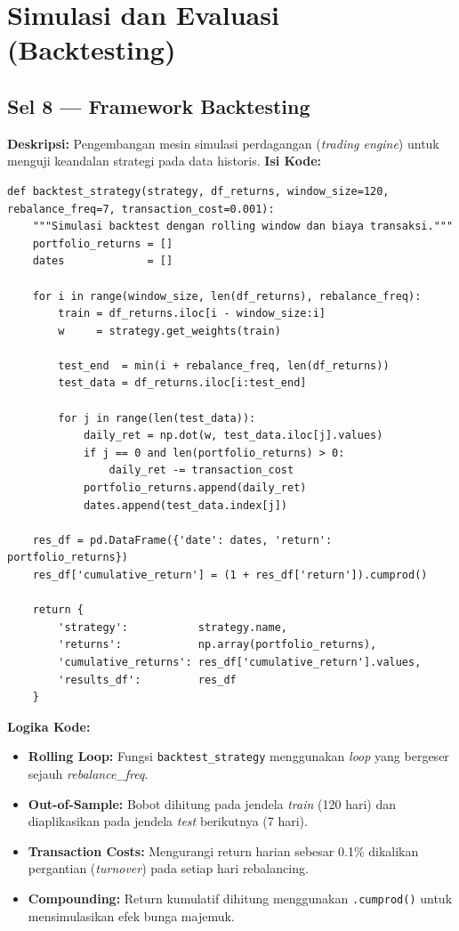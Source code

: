 \documentclass[12pt, a4paper]{article}
\begin{document}
\section{Simulasi dan Evaluasi (Backtesting)}

\subsection{Sel 8 — Framework Backtesting}
\textbf{Deskripsi:} Pengembangan mesin simulasi perdagangan (\textit{trading engine}) untuk menguji keandalan strategi pada data historis.
\textbf{Isi Kode:}
\begin{lstlisting}
def backtest_strategy(strategy, df_returns, window_size=120, rebalance_freq=7, transaction_cost=0.001):
    """Simulasi backtest dengan rolling window dan biaya transaksi."""
    portfolio_returns = []
    dates             = []

    for i in range(window_size, len(df_returns), rebalance_freq):
        train = df_returns.iloc[i - window_size:i]
        w     = strategy.get_weights(train)

        test_end  = min(i + rebalance_freq, len(df_returns))
        test_data = df_returns.iloc[i:test_end]

        for j in range(len(test_data)):
            daily_ret = np.dot(w, test_data.iloc[j].values)
            if j == 0 and len(portfolio_returns) > 0:
                daily_ret -= transaction_cost
            portfolio_returns.append(daily_ret)
            dates.append(test_data.index[j])

    res_df = pd.DataFrame({'date': dates, 'return': portfolio_returns})
    res_df['cumulative_return'] = (1 + res_df['return']).cumprod()

    return {
        'strategy':           strategy.name,
        'returns':            np.array(portfolio_returns),
        'cumulative_returns': res_df['cumulative_return'].values,
        'results_df':         res_df
    }
\end{lstlisting}
\textbf{Logika Kode:}
\begin{itemize}
    \item \textbf{Rolling Loop:} Fungsi \texttt{backtest\_strategy} menggunakan \textit{loop} yang bergeser sejauh \textit{rebalance\_freq}.
    \item \textbf{Out-of-Sample:} Bobot dihitung pada jendela \textit{train} (120 hari) dan diaplikasikan pada jendela \textit{test} berikutnya (7 hari).
    \item \textbf{Transaction Costs:} Mengurangi return harian sebesar 0.1\% dikalikan pergantian (\textit{turnover}) pada setiap hari rebalancing.
    \item \textbf{Compounding:} Return kumulatif dihitung menggunakan \texttt{.cumprod()} untuk mensimulasikan efek bunga majemuk.
\end{itemize}
\end{document}
